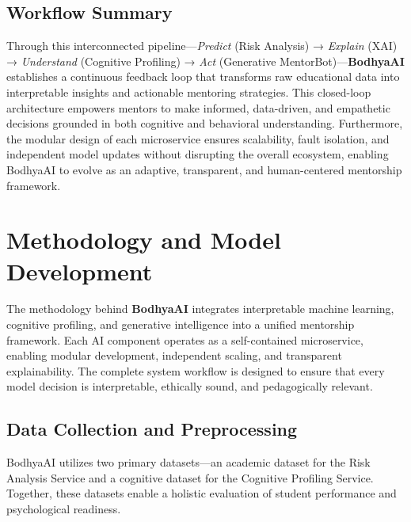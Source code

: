 \documentclass[conference]{IEEEtran}
\begin{document}
\subsection{Workflow Summary}
Through this interconnected pipeline—\textit{Predict} (Risk Analysis) → \textit{Explain} (XAI) → \textit{Understand} (Cognitive Profiling) → \textit{Act} (Generative MentorBot)—\textbf{BodhyaAI} establishes a continuous feedback loop that transforms raw educational data into interpretable insights and actionable mentoring strategies. This closed-loop architecture empowers mentors to make informed, data-driven, and empathetic decisions grounded in both cognitive and behavioral understanding. Furthermore, the modular design of each microservice ensures scalability, fault isolation, and independent model updates without disrupting the overall ecosystem, enabling BodhyaAI to evolve as an adaptive, transparent, and human-centered mentorship framework.



\section{Methodology and Model Development}
The methodology behind \textbf{BodhyaAI} integrates interpretable machine learning, cognitive profiling, and generative intelligence into a unified mentorship framework. Each AI component operates as a self-contained microservice, enabling modular development, independent scaling, and transparent explainability. The complete system workflow is designed to ensure that every model decision is interpretable, ethically sound, and pedagogically relevant.

\subsection{Data Collection and Preprocessing}
BodhyaAI utilizes two primary datasets—an academic dataset for the Risk Analysis Service and a cognitive dataset for the Cognitive Profiling Service. Together, these datasets enable a holistic evaluation of student performance and psychological readiness.
\end{document}
